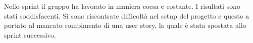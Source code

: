 Nello sprint il gruppo ha lavorato in maniera coesa e costante. I risultati sono stati soddisfacenti. Si sono riscontrate difficoltà nel setup del progetto e questo a portato al mancato compimento di una user story, la quale è stata spostata allo sprint successivo.
